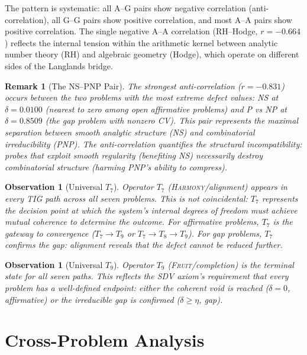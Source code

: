\documentclass[11pt]{article}
\newtheorem{remark}[theorem]{Remark}
\newtheorem{observation}[theorem]{Observation}
\begin{document}
\noindent
The pattern is systematic: all A--G pairs show negative correlation
(anti-correlation), all G--G pairs show positive correlation, and most
A--A pairs show positive correlation.  The single negative A--A
correlation (RH--Hodge, $r = -0.664$) reflects the internal tension
within the arithmetic kernel between analytic number theory (RH) and
algebraic geometry (Hodge), which operate on different sides of the
Langlands bridge.

\begin{remark}[The NS--PNP Pair]
The strongest anti-correlation ($r = -0.831$) occurs between the two
problems with the most extreme defect values: NS at $\delta = 0.0100$
(nearest to zero among open affirmative problems) and P vs NP at
$\delta = 0.8509$ (the gap problem with nonzero CV).  This pair
represents the maximal separation between smooth analytic structure
(NS) and combinatorial irreducibility (PNP).  The anti-correlation
quantifies the structural incompatibility: probes that exploit smooth
regularity (benefiting NS) necessarily destroy combinatorial structure
(harming PNP's ability to compress).
\end{remark}

\begin{observation}[Universal $T_7$]
\label{obs:T7}
Operator $T_7$ (\textsc{Harmony}/alignment) appears in every TIG
path across all seven problems.  This is not coincidental: $T_7$
represents the decision point at which the system's internal degrees
of freedom must achieve mutual coherence to determine the outcome.
For affirmative problems, $T_7$ is the gateway to convergence
($T_7 \to T_9$ or $T_7 \to T_8 \to T_9$).  For gap problems,
$T_7$ confirms the gap: alignment reveals that the defect cannot
be reduced further.
\end{observation}

\begin{observation}[Universal $T_9$]
\label{obs:T9}
Operator $T_9$ (\textsc{Fruit}/completion) is the terminal state for
all seven paths.  This reflects the SDV axiom's requirement that every
problem has a well-defined endpoint: either the coherent void is
reached ($\delta = 0$, affirmative) or the irreducible gap is confirmed
($\delta \geq \eta$, gap).
\end{observation}

\section{Cross-Problem Analysis}
\label{sec:cross}
\end{document}
